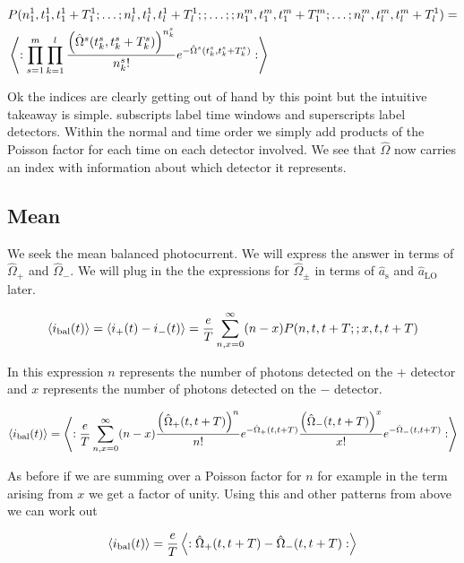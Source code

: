 \documentclass[12pt]{article}
\begin{document}
\begin{align}
&P(n^1_1,t^1_1,t^1_1+T^1_1;\ldots ;n^1_l,t^1_l,t^1_l+T^1_l;; \ldots ;; n^m_1,t^m_1,t^m_1+T^m_1;\ldots ;n^m_l,t^m_l,t^m_l+T^1_l) =\\ 
&\Braket{:\prod_{s=1}^m \prod_{k=1}^l \frac{\left(\hat{\Omega}^s(t^s_k,t^s_k+T^s_k)\right)^{n^s_k}}{n^s_k!} e^{-\hat{\Omega}^s(t^s_k,t^s_k+T^s_k)} :}
\end{align}

Ok the indices are clearly getting out of hand by this point but the intuitive takeaway is simple. subscripts label time windows and superscripts label detectors. Within the normal and time order we simply add products of the Poisson factor for each time on each detector involved. We see that $\hat{\Omega}$ now carries an index with information about which detector it represents.


\subsection{Mean}
We seek the mean balanced photocurrent. We will express the answer in terms of $\hat{\Omega}_+$ and $\hat{\Omega}_-$. We will plug in the the expressions for $\hat{\Omega}_{\pm}$ in terms of $\hat{a}_{\text{s}}$ and $\hat{a}_{\text{LO}}$ later.

\begin{align}
\Braket{i_{\text{bal}}(t)} = \Braket{i_+(t) - i_-(t)} = \frac{e}{T}\sum_{n,x=0}^{\infty} (n-x) P(n,t,t+T;;x,t,t+T)
\end{align}

In this expression $n$ represents the number of photons detected on the $+$ detector and $x$ represents the number of photons detected on the $-$ detector.

\begin{align}
\Braket{i_{\text{bal}}(t)} = \Braket{:\frac{e}{T}\sum_{n,x=0}^{\infty} (n-x) \frac{\left(\hat{\Omega}_+(t,t+T)\right)^n}{n!} e^{-\hat{\Omega}_+(t,t+T)}\frac{\left(\hat{\Omega}_-(t,t+T)\right)^x}{x!} e^{-\hat{\Omega}_-(t,t+T)}:}
\end{align}

As before if we are summing over a Poisson factor for $n$ for example in the term arising from $x$ we get a factor of unity. Using this and other patterns from above we can work out

\begin{align}
\Braket{i_{\text{bal}}(t)} = \frac{e}{T}\Braket{:\hat{\Omega}_+(t,t+T) - \hat{\Omega}_-(t,t+T):}
\end{align}
\end{document}
